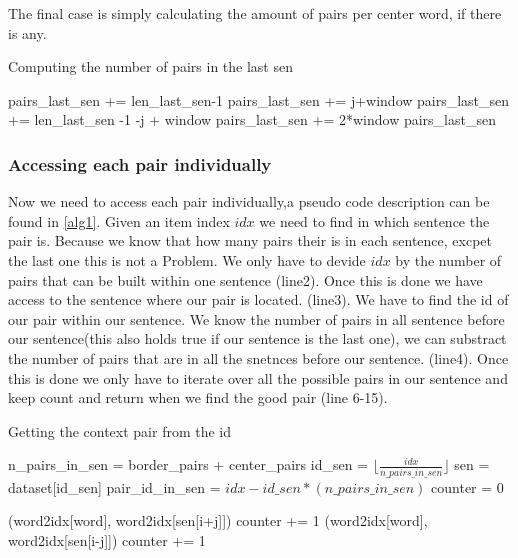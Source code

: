 The final case is simply calculating the amount of pairs per center word, if there is any. 
\begin{algorithm}
\caption{Computing the number of pairs in the last sen}
\label{alg2}
\begin{algorithmic}[1]
\STATE pairs\_last\_sen += len\_last\_sen-1
\ELSE
\STATE pairs\_last\_sen += j+window
\ENDIF
{}
\STATE pairs\_last\_sen += len\_last\_sen -1 -j + window
\ELSE
\STATE pairs\_last\_sen += 2*window
\ENDIF
\ENDFOR
\RETURN pairs\_last\_sen
\end{algorithmic}
\end{algorithm}
 
 \subsubsection{Accessing each pair individually}
Now we need to access each pair individually,a pseudo code description can be found in \ref{alg1}.
Given an item index $idx$ we need to find in which sentence the pair is. Because we know that how many pairs their is in each sentence, excpet the last one this is not a Problem. We only have to devide $idx$ by the number of pairs that can be built within one sentence (line2). Once this is done we have access to the sentence where our pair is located. (line3). We have to find the id of our pair within our sentence. We know the number of pairs in all sentence before our sentence(this also holds true if our sentence is the last one), we can substract the number of pairs that are in all the snetnces before our sentence. (line4). Once this is done we only have to iterate over all the possible pairs in our sentence and keep count and return when we find the good pair (line 6-15).
\begin{algorithm}
\caption{Getting the context pair from the id}
\label{alg1}
\begin{algorithmic}[1]

\STATE n\_pairs\_in\_sen = border\_pairs + center\_pairs
 \STATE id\_sen = $\lfloor \frac{idx}{n\_pairs\_in\_sen} \rfloor$
\STATE  sen  = dataset[id\_sen]
\STATE  pair\_id\_in\_sen = $idx - id\_sen*(n\_pairs\_in\_sen)$
\STATE counter = 0

\RETURN (word2idx[word], word2idx[sen[i+j]])
\ENDIF
\STATE counter += 1
\ENDIF
{}
\RETURN (word2idx[word], word2idx[sen[i-j]])
\ENDIF
\STATE counter += 1
\ENDIF
\ENDFOR
\ENDFOR
\end{algorithmic}
\end{algorithm}

